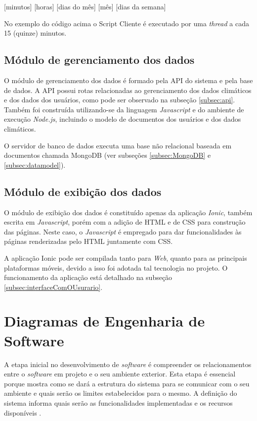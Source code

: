 \centerline{[minutos] [horas] [dias do mês] [mês] [dias da semana]}


No exemplo do código acima o Script Cliente é executado por uma \textit{thread} a cada 15 (quinze) minutos.

\subsection{Módulo de gerenciamento dos dados}

O módulo de gerenciamento dos dados é formado pela API do sistema e pela base de dados. A API possui rotas relacionadas ao gerenciamento dos dados climáticos e dos dados dos usuários, como pode ser observado na subseção \ref{subsec:api}. Também foi construída utilizando-se da linguagem \textit{Javascript} e do ambiente de execução \textit{Node.js}, incluindo o modelo de documentos dos usuários e dos dados climáticos.
 
O servidor de banco de dados executa uma base não relacional baseada em documentos chamada MongoDB (ver subseções \ref{subsec:MongoDB} e \ref{subsec:datamodel}).

 \subsection{Módulo de exibição dos dados}

O módulo de exibição dos dados é constituído apenas da aplicação \textit{Ionic}, também escrita em \textit{Javascript}, porém com a adição de HTML e de CSS para construção das páginas. Neste caso, o \textit{Javascript} é empregado para dar funcionalidades às páginas renderizadas pelo HTML juntamente com CSS.

A aplicação Ionic pode ser compilada tanto para \textit{Web}, quanto para as principais plataformas móveis, devido a isso foi adotada tal tecnologia no projeto. O funcionamento da aplicação está detalhado na subseção \ref{subsec:interfaceComOUsurario}.


\section{Diagramas de Engenharia de Software} \label{sec:diagramas}
A etapa inicial no desenvolvimento de \textit{software} é compreender os relacionamentos entre o \textit{software} em projeto e o seu ambiente exterior. Esta etapa é essencial porque mostra como se dará a estrutura do sistema para se comunicar com o seu ambiente e quais serão os limites estabelecidos para o mesmo. A definição do sistema informa quais serão as funcionalidades implementadas e os recursos disponíveis \cite{sommerville2011engenharia}.

